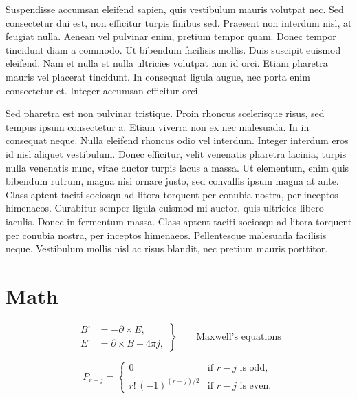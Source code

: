 \documentclass[12pt]{article} %
\begin{document}
Suspendisse accumsan eleifend sapien, quis vestibulum mauris volutpat nec. Sed consectetur dui est,
non efficitur turpis finibus sed. Praesent non interdum nisl, at feugiat nulla. Aenean vel pulvinar
enim, pretium tempor quam. Donec tempor tincidunt diam a commodo. Ut bibendum facilisis mollis. Duis
suscipit euismod eleifend. Nam et nulla et nulla ultricies volutpat non id orci. Etiam pharetra mauris
vel placerat tincidunt. In consequat ligula augue, nec porta enim consectetur et. Integer accumsan
efficitur orci.

Sed pharetra est non pulvinar tristique. Proin rhoncus scelerisque risus, sed tempus ipsum consectetur
a. Etiam viverra non ex nec malesuada. In in consequat neque. Nulla eleifend rhoncus odio vel
interdum. Integer interdum eros id nisl aliquet vestibulum. Donec efficitur, velit venenatis pharetra
lacinia, turpis nulla venenatis nunc, vitae auctor turpis lacus a massa. Ut elementum, enim quis
bibendum rutrum, magna nisi ornare justo, sed convallis ipsum magna at ante. Class aptent taciti
sociosqu ad litora torquent per conubia nostra, per inceptos himenaeos. Curabitur semper ligula
euismod mi auctor, quis ultricies libero iaculis. Donec in fermentum massa. Class aptent taciti
sociosqu ad litora torquent per conubia nostra, per inceptos himenaeos. Pellentesque malesuada
facilisis neque. Vestibulum mollis nisl ac risus blandit, nec pretium mauris porttitor.

\section{Math}


\begin{equation*}
\left.\begin{aligned}
B’&=-\partial\times E,\\
E’&=\partial\times B - 4\pi j,
\end{aligned}
\right\}
\qquad \text{Maxwell’s equations}
\end{equation*}

\[
P_{r-j}=\begin{cases}
0& \text{if $r-j$ is odd},\\
r!\,(-1)^{(r-j)/2}& \text{if $r-j$ is even}.
\end{cases}
\]



\end{document}
